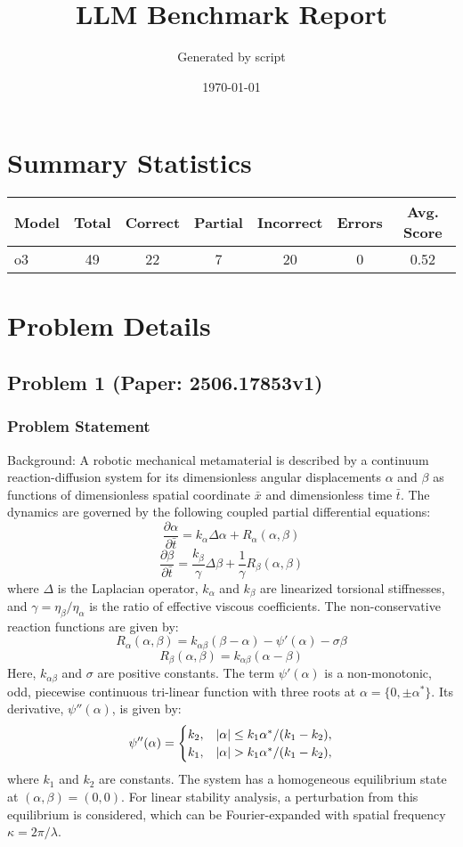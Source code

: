 \documentclass[10pt]{article}
\title{LLM Benchmark Report}
\author{Generated by script}
\date{\today}
\begin{document}
\maketitle

\section*{Summary Statistics}
\begin{center}
\begin{longtable}{|l|c|c|c|c|c|c|}
\hline
\textbf{Model} & \textbf{Total} & \textbf{Correct} & \textbf{Partial} & \textbf{Incorrect} & \textbf{Errors} & \textbf{Avg. Score} \\
\hline
\endfirsthead
\hline
\endfoot
o3 & 49 & 22 & 7 & 20 & 0 & 0.52 \\
\hline
\end{longtable}
\end{center}
\section*{Problem Details}

\subsection*{Problem 1 (Paper: 2506.17853v1)}
\subsubsection*{Problem Statement}
Background:
A robotic mechanical metamaterial is described by a continuum reaction-diffusion system for its dimensionless angular displacements $\alpha$ and $\beta$ as functions of dimensionless spatial coordinate $\bar{x}$ and dimensionless time $\bar{t}$. The dynamics are governed by the following coupled partial differential equations:
$$
\frac{\partial \alpha}{\partial \bar{t}} = k_\alpha \Delta \alpha + R_\alpha(\alpha,\beta)
$$
$$
\frac{\partial \beta}{\partial \bar{t}} = \frac{k_\beta}{\gamma} \Delta \beta + \frac{1}{\gamma}R_\beta(\alpha,\beta)
$$
where $\Delta$ is the Laplacian operator, $k_\alpha$ and $k_\beta$ are linearized torsional stiffnesses, and $\gamma = \eta_\beta/\eta_\alpha$ is the ratio of effective viscous coefficients. The non-conservative reaction functions are given by:
$$
R_{\alpha}(\alpha,\beta) = k_{\alpha\beta} (\beta-\alpha)-\psi'(\alpha)-\sigma\beta
$$
$$
R_{\beta}(\alpha,\beta) = k_{\alpha\beta} (\alpha-\beta)
$$
Here, $k_{\alpha\beta}$ and $\sigma$ are positive constants. The term $\psi'(\alpha)$ is a non-monotonic, odd, piecewise continuous tri-linear function with three roots at $\alpha=\{0,\pm\alpha^*\}$. Its derivative, $\psi''(\alpha)$, is given by:
$$
\psi''(\alpha)=\begin{cases}
		k_2, & |\alpha|\leq k_1\alpha^*/(k_1-k_2),
		\cr k_1, & |\alpha|>k_1\alpha^*/(k_1-k_2),
	\end{cases}
$$
where $k_1$ and $k_2$ are constants. The system has a homogeneous equilibrium state at $(\alpha,\beta)=(0,0)$. For linear stability analysis, a perturbation from this equilibrium is considered, which can be Fourier-expanded with spatial frequency $\kappa=2\pi/\lambda$.
\end{document}

